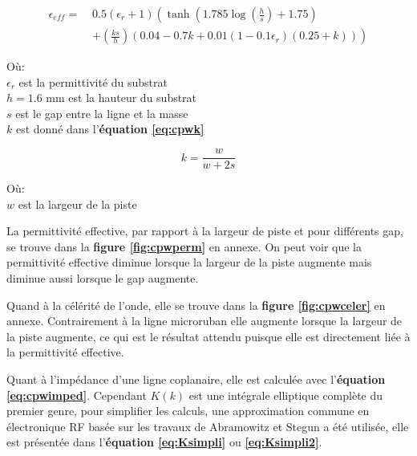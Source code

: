 \documentclass[12pt]{article}
\begin{document}
\vspace{0.5cm}
{\large
\begin{align}
\epsilon_{eff} =\; & 0.5\left(\epsilon_r+1\right)
\left(\tanh\left(1.785\log\left(\frac{h}{s}\right)+1.75\right)\right. \nonumber \\
& \left. + \left(\frac{ks}{h}\right)
\left(0.04-0.7k+0.01\left(1-0.1\epsilon_r\right)\left(0.25+k\right)\right)\right)
\label{eq:cpwperm}
\end{align}
\vspace{1cm}
}


Où:\\
$\epsilon_r$ est la permittivité du substrat\\
$h = 1.6$ mm est la hauteur du substrat\\
$s$ est le gap entre la ligne et la masse\\
$k$ est donné dans l'\textbf{équation \ref{eq:cpwk}}

\vspace{0.5cm}
{\large
\begin{equation}
k=\frac{w}{w+2s}
\label{eq:cpwk}
\end{equation}
\vspace{1cm}
}

Où:\\
$w$ est la largeur de la piste

\vspace{1cm}
La permittivité effective, par rapport à la largeur de piste et pour différents gap, se trouve dans la \textbf{figure \ref{fig:cpwperm}} en annexe. On peut voir que la permittivité effective diminue lorsque la largeur de la piste augmente mais diminue aussi lorsque le gap augmente. 

\vspace{0.5cm}
Quand à la célérité de l'onde, elle se trouve dans la \textbf{figure \ref{fig:cpwceler}} en annexe. Contrairement à la ligne microruban elle augmente lorsque la largeur de la piste augmente, ce qui est le résultat attendu puisque elle est directement liée à la permittivité effective.  

\newpage
Quant à l’impédance d'une ligne coplanaire, elle est calculée avec l'\textbf{équation \ref{eq:cpwimped}}. Cependant $K(k)$ est une intégrale elliptique complète du premier genre, pour simplifier les calculs, une approximation commune en électronique RF basée sur les travaux de Abramowitz et Stegun a été utilisée, elle est présentée dans l'\textbf{équation \ref{eq:Ksimpli}} ou \textbf{\ref{eq:Ksimpli2}}.
\end{document}
